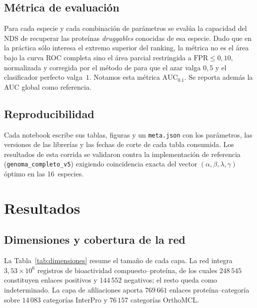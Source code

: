 \documentclass[11pt,a4paper]{article}
\newcommand{\AUCcero}{\text{AUC}_{0.1}}
\begin{document}
\subsection{Métrica de evaluación}

Para cada especie y cada combinación de parámetros se evalúa la capacidad del
NDS de recuperar las proteínas \emph{druggables} conocidas de esa especie. Dado
que en la práctica sólo interesa el extremo superior del ranking, la métrica no
es el área bajo la curva ROC completa sino el área parcial restringida a
$\text{FPR} \le 0{,}10$, normalizada y corregida por el método de
\citet{mcclish1989} para que el azar valga $0{,}5$ y el clasificador perfecto
valga~$1$. Notamos esta métrica $\AUCcero$. Se reporta además la AUC global como
referencia.

\subsection{Reproducibilidad}

Cada notebook escribe sus tablas, figuras y un \texttt{meta.json} con los
parámetros, las versiones de las librerías y las fechas de corte de cada tabla
consumida. Los resultados de esta corrida se validaron contra la
implementación de referencia (\texttt{genoma\_completo\_v5}) exigiendo
coincidencia exacta del vector $(\alpha,\beta,\lambda,\gamma)$ óptimo en las
16~especies.

\section{Resultados}

\subsection{Dimensiones y cobertura de la red}
\label{sec:red}

La Tabla~\ref{tab:dimensiones} resume el tamaño de cada capa. La red integra
$3{,}53 \times 10^{6}$ registros de bioactividad compuesto--proteína, de los
cuales $248\,545$ constituyen enlaces positivos y $144\,552$ negativos; el
resto queda como indeterminado. La capa de afiliaciones aporta $769\,661$
enlaces proteína--categoría sobre $14\,083$ categorías InterPro y $76\,157$
categorías OrthoMCL.
\end{document}
